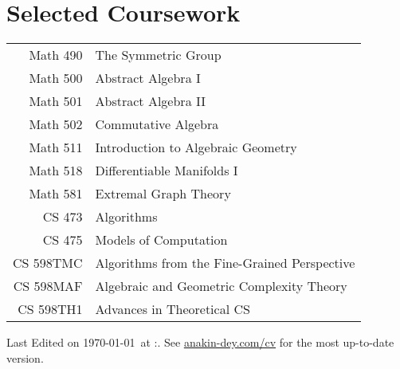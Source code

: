 \documentclass[11pt,a4paper,sans]{moderncv}
\begin{document}



\section{Selected Coursework}
{
\setlength{\tabcolsep}{6pt}
\begin{tabular}{rl}
  Math 490 & The Symmetric Group                                                          \\
  Math 500 & Abstract Algebra I                                                           \\
  Math 501 & Abstract Algebra II                                                          \\
  Math 502 & Commutative Algebra                                                          \\
  Math 511 & Introduction to Algebraic Geometry                                           \\
  Math 518 & Differentiable Manifolds I                                                   \\
  Math 581 & Extremal Graph Theory                                                        \\
  CS 473 & Algorithms                                                                     \\
  CS 475 & Models of Computation                                                          \\
  CS 598TMC & Algorithms from the Fine-Grained Perspective                                \\
  CS 598MAF & Algebraic and Geometric Complexity Theory                                   \\
  CS 598TH1 & Advances in Theoretical CS                                                  \\
\end{tabular}
}

\vfill
{}
Last Edited on \today\ at :. See \href{https://www.anakin-dey.com/cv}{\color{lightblue}\ul{anakin-dey.com/cv}} for the most up-to-date version.
\end{document}
